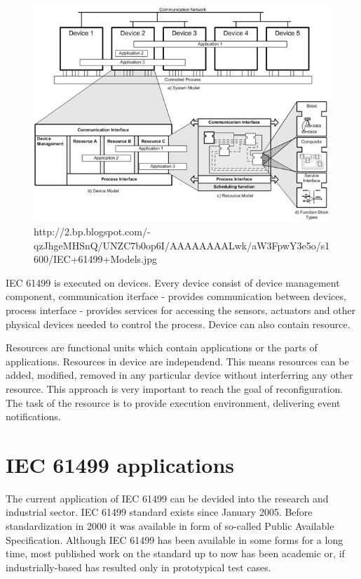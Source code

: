 \begin{figure}[hbp]
\centering
\includegraphics[scale=0.6]{Figures/IEC61499Models}
\decoRule
\caption[IEC 61499 Base Model]{http://2.bp.blogspot.com/-qzJhgeMHSnQ/UNZC7b0op6I/AAAAAAAALwk/aW3FpwY3e5o/s1600/IEC+61499+Models.jpg}
\label{IEC 61499 Base Model}
\end{figure}

IEC 61499 is executed on devices. Every device consist of device management component, communication iterface - provides communication between devices, process interface - provides services for accessing the sensors, actuators and other physical devices needed to control the process. Device can also contain resource. 

Resources are functional units which contain applications or the  parts of applications. Resources in device are independend. This means resources can be added, modified, removed in any particular device without interferring any other resource. This approach is very important to reach the goal of reconfiguration. The task of the resource is to provide execution environment, delivering event notifications.

\section{IEC 61499 applications}
The current application of IEC 61499 can be devided into the research and industrial sector.
IEC 61499 standard exists since January 2005. Before standardization in 2000 it was available in form of so-called Public Available Specification. Although IEC 61499 has been available in some forms for a long time, most published work on the standard up to now has been academic or, if industrially-based has resulted only in prototypical test cases.\cite{4618110}

